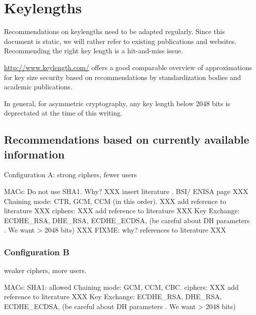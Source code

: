 \section{Keylengths}

Recommendations on keylengths need to be adapted regularly. Since this document is static, we will rather refer to 
existing publications and websites.  Recommending the right key length is a hit-and-miss issue.

\url{http://www.keylength.com/} offers a good comparable overview of approximations for key size security based on recommendations by standardization bodies and academic publications.

In general, for asymmetric cryptography, any key length below 2048 bits is deprectated at the time of this writing.





\subsection{Recommendations based on currently available information}

Configuration A:
strong ciphers, fewer users

MACs: Do not use SHA1. Why? XXX insert literature . BSI/ ENISA page XXX
Chaining mode: CTR, GCM, CCM (in this order).  XXX add reference to literature XXX
ciphers:     XXX add reference to literature XXX
Key Exchange: ECDHE\_RSA, DHE\_RSA, ECDHE\_ECDSA, (be careful about DH parameters . We want > 2048 bits) XXX FIXME: why? references to literature XXX


\subsubsection{Configuration B}
weaker ciphers, more users.


MACs: SHA1:  allowed
Chaining mode: GCM, CCM, CBC.
ciphers:    XXX add reference to literature XXX
Key Exchange: ECDHE\_RSA, DHE\_RSA, ECDHE\_ECDSA, (be careful about DH parameters . We want > 2048 bits)

